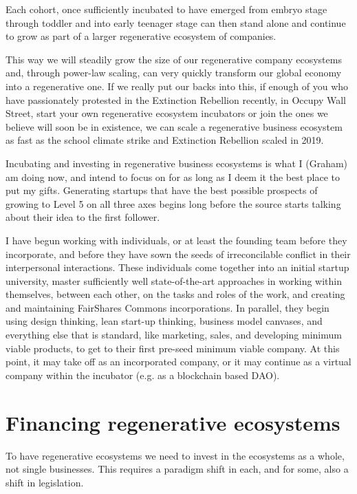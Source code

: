 Each cohort, once sufficiently incubated to have emerged from embryo stage through toddler and into early teenager stage can then stand alone and continue to grow as part of a larger regenerative ecosystem of companies.


This way we will steadily grow the size of our regenerative company ecosystems and, through power-law scaling, can very quickly transform our global economy into a regenerative one. If we really put our backs into this, if enough of you who have passionately protested in the Extinction Rebellion recently, in Occupy Wall Street, start your own regenerative ecosystem incubators or join the ones we believe will soon be in existence, we can scale a regenerative business ecosystem as fast as the school climate strike and Extinction Rebellion scaled in 2019.


Incubating and investing in regenerative business ecosystems is what I (Graham) am doing now, and intend to focus on for as long as I deem it the best place to put my gifts. Generating startups that have the best possible prospects of growing to Level 5 on all three axes begins long before the source starts talking about their idea to the first follower.


I have begun working with individuals, or at least the founding team before they incorporate, and before they have sown the seeds of irreconcilable conflict in their interpersonal interactions. These individuals come together into an initial startup university, master sufficiently well state-of-the-art approaches in working within themselves, between each other, on the tasks and roles of the work, and creating and maintaining FairShares Commons incorporations. In parallel, they begin using design thinking, lean start-up thinking,  business model canvases, and everything else that is standard, like marketing, sales, and developing minimum viable products, to get to their first pre-seed minimum viable company. At this point, it may take off as an incorporated company, or it may continue as a virtual company within the incubator (e.g. as a blockchain based DAO).




\section{Financing regenerative ecosystems}
To have regenerative ecosystems we need to invest in the ecosystems as a whole, not single businesses. This requires a paradigm shift in each, and for some, also a shift in legislation. 


